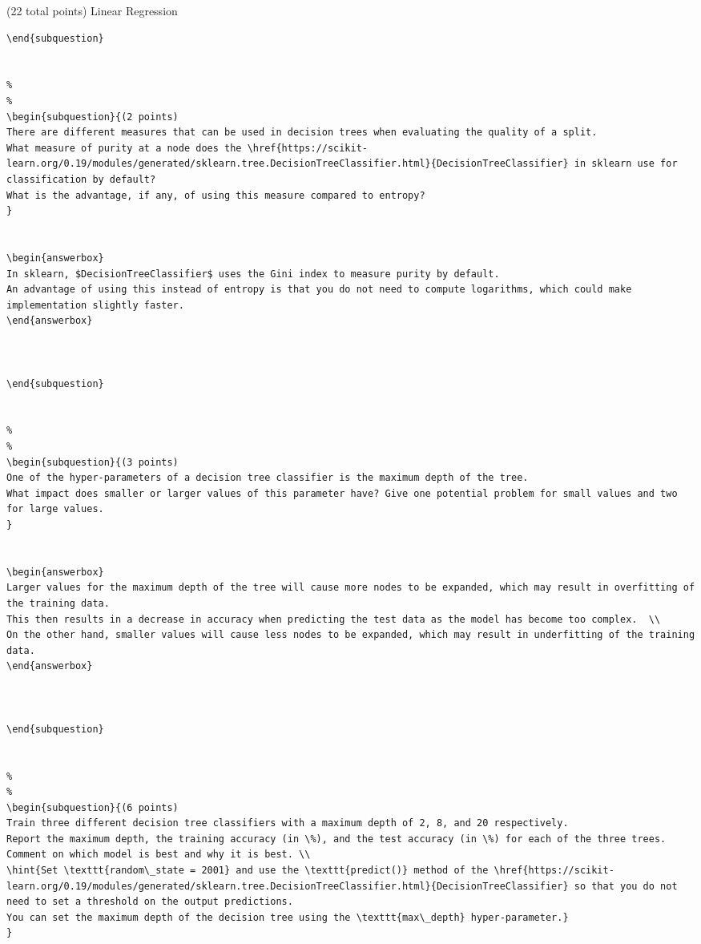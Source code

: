 \documentclass[12pt]{article}
\begin{document}
\begin{question}{(22 total points) Linear Regression}
\begin{subquestion}
\begin{answerbox}{20em}
\begin {verbatim}
\end{subquestion}


%
%
\begin{subquestion}{(2 points) 
There are different measures that can be used in decision trees when evaluating the quality of a split. 
What measure of purity at a node does the \href{https://scikit-learn.org/0.19/modules/generated/sklearn.tree.DecisionTreeClassifier.html}{DecisionTreeClassifier} in sklearn use for classification by default? 
What is the advantage, if any, of using this measure compared to entropy? 
}


\begin{answerbox}{10em}
In sklearn, $DecisionTreeClassifier$ uses the Gini index to measure purity by default. 
An advantage of using this instead of entropy is that you do not need to compute logarithms, which could make implementation slightly faster.
\end{answerbox}



\end{subquestion}


%
%
\begin{subquestion}{(3 points) 
One of the hyper-parameters of a decision tree classifier is the maximum depth of the tree. 
What impact does smaller or larger values of this parameter have? Give one potential problem for small values and two for large values. 
}


\begin{answerbox}{10em}
Larger values for the maximum depth of the tree will cause more nodes to be expanded, which may result in overfitting of the training data. 
This then results in a decrease in accuracy when predicting the test data as the model has become too complex.  \\
On the other hand, smaller values will cause less nodes to be expanded, which may result in underfitting of the training data.
\end{answerbox}



\end{subquestion}


%
%
\begin{subquestion}{(6 points) 
Train three different decision tree classifiers with a maximum depth of 2, 8, and 20 respectively.
Report the maximum depth, the training accuracy (in \%), and the test accuracy (in \%) for each of the three trees.
Comment on which model is best and why it is best. \\
\hint{Set \texttt{random\_state = 2001} and use the \texttt{predict()} method of the \href{https://scikit-learn.org/0.19/modules/generated/sklearn.tree.DecisionTreeClassifier.html}{DecisionTreeClassifier} so that you do not need to set a threshold on the output predictions.
You can set the maximum depth of the decision tree using the \texttt{max\_depth} hyper-parameter.}
}



\end{verbatim}
\end{answerbox}
\end{subquestion}
\end{question}
\end{document}
